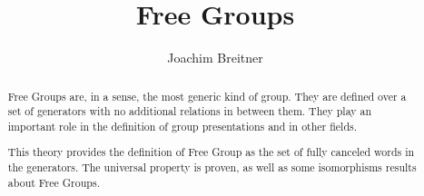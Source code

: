 \documentclass[11pt,a4paper]{article}
\begin{document}
\title{Free Groups}
\author{Joachim Breitner}
\maketitle

\begin{abstract}
  Free Groups are, in a sense, the most generic kind of group. They are defined
  over a set of generators with no additional relations in between them. They
  play an important role in the definition of group presentations and in
  other fields.

  This theory provides the definition of Free Group as the set of fully
  canceled words in the generators. The universal property is proven, as well as some
  isomorphisms results about Free Groups.
\end{abstract}

\tableofcontents



%
%
\end{document}
